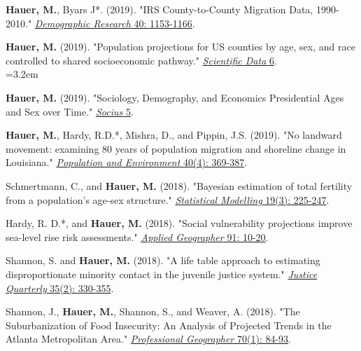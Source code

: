 \begin{etaremune}
    \item \textbf{Hauer, M.}, Byars J*. (2019). "IRS County-to-County Migration Data, 1990-2010." \href{https://www.demographic-research.org/volumes/vol40/40/default.htm}{\textit{Demographic Research} 40: 1153-1166}.

  \item \textbf{Hauer, M.} (2019). "Population projections for US counties by age, sex, and race controlled to shared socioeconomic pathway." \href{https://www.nature.com/articles/sdata20195}{\textit{Scientific Data} 6}.\\
  \hangindent=3.2em\hspace{3em}{\footnotesize * Winner of the 2018 E. Walter Terrie Award from the Southern Demographic Association.}\\

   \item \textbf{Hauer, M.} (2019). "Sociology, Demography, and Economics Presidential Ages and Sex over Time." \href{https://journals.sagepub.com/doi/abs/10.1177/2378023118825221}{\textit{Socius} 5}.

  \item \textbf{Hauer, M.}, Hardy, R.D.*, Mishra, D., and Pippin, J.S. (2019). "No landward movement: examining 80 years of population migration and shoreline change in Louisiana." \href{https://link.springer.com/article/10.1007/s11111-019-00315-8}{\textit{Population and Environment} 40(4): 369-387}.

 \item Schmertmann, C., and \textbf{Hauer, M.} (2018). "Bayesian estimation of total fertility from a population's age-sex structure." \href{https://doi.org/10.1177/1471082X18801450 }{\textit{Statistical Modelling} 19(3): 225-247}.

\item Hardy, R. D.*, and \textbf{Hauer, M.} (2018). "Social vulnerability projections improve sea-level rise risk assessments." \href{https://www.sciencedirect.com/science/article/pii/S0143622817309189}{\textit{Applied Geographer} 91: 10-20}.

\item Shannon, S. and \textbf{Hauer, M.} (2018). "A life table approach to estimating disproportionate minority contact in the juvenile justice system." \href{http://www.tandfonline.com/doi/full/10.1080/07418825.2017.1315163}{\textit{Justice Quarterly} 35(2): 330-355}.

\item Shannon, J., \textbf{Hauer, M.}, Shannon, S., and Weaver, A. (2018). "The Suburbanization of Food Insecurity: An Analysis of Projected     Trends in the Atlanta Metropolitan Area." \href{http://www.tandfonline.com/doi/full/10.1080/00330124.2017.1325751}{\textit{Professional Geographer} 70(1): 84-93}.


\end{etaremune}
